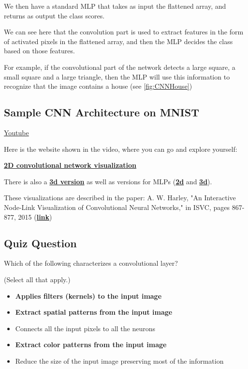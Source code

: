 We then have a standard MLP that takes as input the flattened array, and returns as output the class scores.

We can see here that the convolution part is used to extract features in the form of activated pixels in the flattened array, and then the MLP decides the class based on those features.

For example, if the convolutional part of the network detects a large square, a small square and a large triangle, then the MLP will use this information to recognize that the image contains a house (see \autoref{fig:CNNHouse})

\subsection{Sample CNN Architecture on MNIST}
\href{https://www.youtube.com/watch?v=rdBkYsx0Vw4&t=1s&ab_channel=Udacity}{Youtube} \newline

Here is the website shown in the video, where you can go and explore yourself:\newline

\href{https://www.cs.cmu.edu/~aharley/vis/conv/flat.html}{\textbf{2D convolutional network visualization}}\newline

There is also a \href{https://www.cs.cmu.edu/~aharley/vis/conv/}{\textbf{3d version}} as well as versions for MLPs (\href{https://www.cs.cmu.edu/~aharley/vis/fc/flat.html}{\textbf{2d}} and \href{https://www.cs.cmu.edu/~aharley/vis/fc/}{\textbf{3d}}).\newline

These visualizations are described in the paper: A. W. Harley, "An Interactive Node-Link Visualization of Convolutional Neural Networks," in ISVC, pages 867-877, 2015 (\href{https://www.cs.cmu.edu/~aharley/vis/}{\textbf{link}})

\subsection{Quiz Question}

Which of the following characterizes a convolutional layer?

(Select all that apply.)
\begin{itemize}
    \item \textbf{Applies filters (kernels) to the input image}
    \item \textbf{Extract spatial patterns from the input image}
    \item Connects all the input pixels to all the neurons
    \item \textbf{Extract color patterns from the input image}
    \item Reduce the size of the input image preserving most of the information
\end{itemize}

